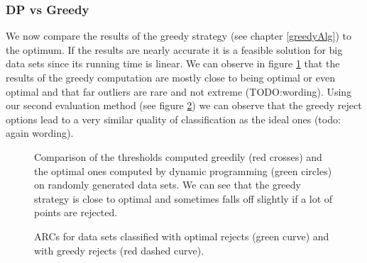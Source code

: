 \subsubsection{DP vs Greedy}
We now compare the results of the greedy strategy (see chapter \ref{greedyAlg}) to the optimum. If the results are nearly accurate it is a feasible solution for big data sets since its running time is linear. We can observe in figure \ref{greedyEvaPareto} that the results of the greedy computation are mostly close to being optimal or even optimal and that far outliers are rare and not extreme (TODO:wording). Using our second evaluation method (see figure \ref{greedyEvaARC}) we can observe that the greedy reject options lead to a very similar quality of classification as the ideal ones (todo: again wording).

\begin{figure}[!htbp]
\centering
\caption{Comparison of the thresholds computed greedily (red crosses) and the optimal ones computed by dynamic programming (green circles) on randomly generated data sets. We can see that the greedy strategy is close to optimal and sometimes falls off slightly if a lot of points are rejected.}
\label{greedyEvaPareto}
\end{figure}


\begin{figure}[!htbp]
\centering
\caption{ARCs for data sets classified with optimal rejects (green curve) and with greedy rejects (red dashed curve).}
\label{greedyEvaARC}
\end{figure}
